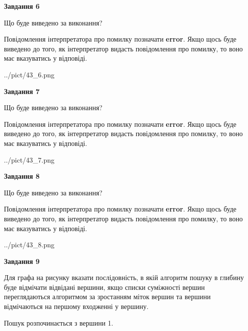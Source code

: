 \documentclass[12pt, ukrainian]{article}
\begin{document}
{\begin {large}
{\begin {center}\textbf{Завдання 6}\end {center}}\par
Що буде виведено за виконання?

Повідомлення інтерпретатора про помилку позначати \textbf{error}.
Якщо щось буде виведено до того, як інтерпретатор видасть повідомлення про помилку, 
то воно має вказуватись у відповіді. \par


\begin{center}
	{../pict/43_6.png}
\end{center}
\newpage

{\begin {center}\textbf{Завдання 7}\end {center}}\par
Що буде виведено за виконання?

Повідомлення інтерпретатора про помилку позначати \textbf{error}.
Якщо щось буде виведено до того, як інтерпретатор видасть повідомлення про помилку, 
то воно має вказуватись у відповіді. \par


\begin{center}
	{../pict/43_7.png}
\end{center}
\newpage

{\begin {center}\textbf{Завдання 8}\end {center}}\par
Що буде виведено за виконання?

Повідомлення інтерпретатора про помилку позначати \textbf{error}.
Якщо щось буде виведено до того, як інтерпретатор видасть повідомлення про помилку, 
то воно має вказуватись у відповіді. \par


\begin{center}
	{../pict/43_8.png}
\end{center}
\newpage

{\begin {center}\textbf{Завдання 9}\end {center}}\par
Для графа на рисунку вказати послідовність, в якій алгоритм пошуку в глибину буде відмічати відвідані вершини, якщо списки суміжності вершин переглядаються алгоритмом за зростанням міток вершин та вершини відмічаються на першому вход\-женні у вершину.\par
Пошук розпочинається з вершини 1.\par


\end{large}}
\end{document}
